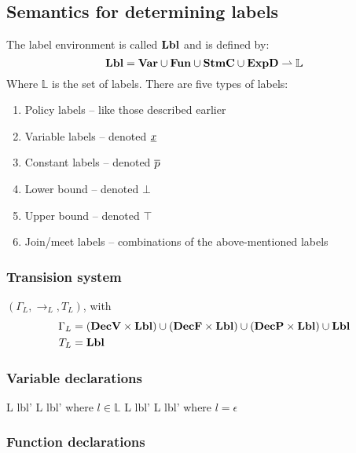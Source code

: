 \subsection{Semantics for determining labels}
The label environment is called $\mathbf{Lbl}$ and is defined by:
\[
  \mathbf{Lbl} = \mathbf{Var} \cup \mathbf{Fun} \cup \mathbf{StmC} \cup \mathbf{ExpD} \rightharpoonup \mathbb{L}
\]
Where $\mathbb{L}$ is the set of labels.
There are five types of labels:
\begin{enumerate}
  \item Policy labels -- like those described earlier
  \item Variable labels -- denoted $\underline{x}$
  \item Constant labels -- denoted $\overline{p}$
  \item Lower bound -- denoted $\bot$
  \item Upper bound -- denoted $\top$
  \item Join/meet labels -- combinations of the above-mentioned labels
\end{enumerate}

\subsubsection{Transision system}
$(\Gamma_{L}, \rightarrow_{L}, T_{L})$, with
\begin{align*}
  \Gamma_{L} & = (\mathbf{DecV} \times \mathbf{Lbl}) \cup (\mathbf{DecF} \times \mathbf{Lbl}) \cup (\mathbf{DecP} \times \mathbf{Lbl}) \cup \mathbf{Lbl} \\
  T_{L} & = \mathbf{Lbl}
\end{align*}

\subsubsection{Variable declarations}

\begin{trules}
        { {L} {lbl'} }
        { {L} {lbl'} }
        {where $l \in \mathbb{L}$}
        { {L} {lbl'} }
        { {L} {lbl'} }
        {where $l = \epsilon$}
\end{trules}

\subsubsection{Function declarations}

